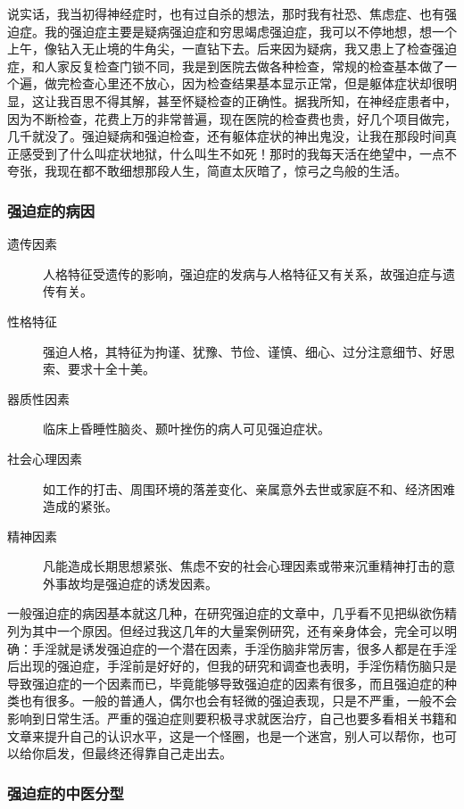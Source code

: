 \documentclass{ctexart}
\begin{document}
说实话，我当初得神经症时，也有过自杀的想法，那时我有社恐、焦虑症、也有强迫症。我的强迫症主要是疑病强迫症和穷思竭虑强迫症，我可以不停地想，想一个上午，像钻入无止境的牛角尖，一直钻下去。后来因为疑病，我又患上了检查强迫症，和人家反复检查门锁不同，我是到医院去做各种检查，常规的检查基本做了一个遍，做完检查心里还不放心，因为检查结果基本显示正常，但是躯体症状却很明显，这让我百思不得其解，甚至怀疑检查的正确性。据我所知，在神经症患者中，因为不断检查，花费上万的非常普遍，现在医院的检查费也贵，好几个项目做完，几千就没了。强迫疑病和强迫检查，还有躯体症状的神出鬼没，让我在那段时间真正感受到了什么叫症状地狱，什么叫生不如死！那时的我每天活在绝望中，一点不夸张，我现在都不敢细想那段人生，简直太灰暗了，惊弓之鸟般的生活。

\subsubsection{强迫症的病因}

\begin{description}
    \item[遗传因素] 人格特征受遗传的影响，强迫症的发病与人格特征又有关系，故强迫症与遗传有关。
    \item[性格特征] 强迫人格，其特征为拘谨、犹豫、节俭、谨慎、细心、过分注意细节、好思索、要求十全十美。
    \item[器质性因素] 临床上昏睡性脑炎、颞叶挫伤的病人可见强迫症状。
    \item[社会心理因素] 如工作的打击、周围环境的落差变化、亲属意外去世或家庭不和、经济困难造成的紧张。
    \item[精神因素] 凡能造成长期思想紧张、焦虑不安的社会心理因素或带来沉重精神打击的意外事故均是强迫症的诱发因素。
\end{description}

一般强迫症的病因基本就这几种，在研究强迫症的文章中，几乎看不见把纵欲伤精列为其中一个原因。但经过我这几年的大量案例研究，还有亲身体会，完全可以明确：手淫就是诱发强迫症的一个潜在因素，手淫伤脑非常厉害，很多人都是在手淫后出现的强迫症，手淫前是好好的，但我的研究和调查也表明，手淫伤精伤脑只是导致强迫症的一个因素而已，毕竟能够导致强迫症的因素有很多，而且强迫症的种类也有很多。一般的普通人，偶尔也会有轻微的强迫表现，只是不严重，一般不会影响到日常生活。严重的强迫症则要积极寻求就医治疗，自己也要多看相关书籍和文章来提升自己的认识水平，这是一个怪圈，也是一个迷宫，别人可以帮你，也可以给你启发，但最终还得靠自己走出去。

\subsubsection{强迫症的中医分型}
\end{document}
